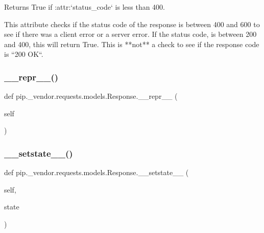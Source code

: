 \begin{DoxyVerb}Returns True if :attr:`status_code` is less than 400.

This attribute checks if the status code of the response is between
400 and 600 to see if there was a client error or a server error. If
the status code, is between 200 and 400, this will return True. This
is **not** a check to see if the response code is ``200 OK``.
\end{DoxyVerb}
 \mbox{\label{classpip_1_1__vendor_1_1requests_1_1models_1_1Response_a0b1d38c00f8de48ce461d513b1efea42}} 
\subsubsection{\texorpdfstring{\+\_\+\+\_\+repr\+\_\+\+\_\+()}{\_\_repr\_\_()}}
{\footnotesize\ttfamily def pip.\+\_\+vendor.\+requests.\+models.\+Response.\+\_\+\+\_\+repr\+\_\+\+\_\+ (\begin{DoxyParamCaption}\item[{}]{self }\end{DoxyParamCaption})}

\mbox{\label{classpip_1_1__vendor_1_1requests_1_1models_1_1Response_ae861d75f0bb2c65f80aaf09745542978}} 
\subsubsection{\texorpdfstring{\+\_\+\+\_\+setstate\+\_\+\+\_\+()}{\_\_setstate\_\_()}}
{\footnotesize\ttfamily def pip.\+\_\+vendor.\+requests.\+models.\+Response.\+\_\+\+\_\+setstate\+\_\+\+\_\+ (\begin{DoxyParamCaption}\item[{}]{self,  }\item[{}]{state }\end{DoxyParamCaption})}

